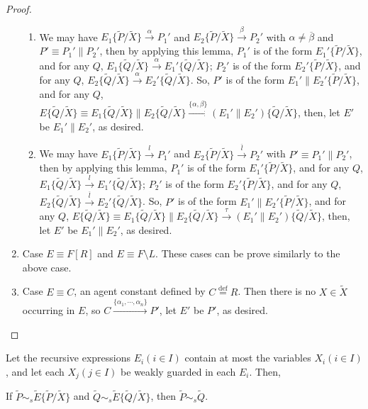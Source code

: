 \begin{proof}
\begin{enumerate}
\begin{enumerate}
    \item We may have $E_1\{\widetilde{P}/\widetilde{X}\} \xrightarrow{\alpha}P_1'$ and $E_2\{\widetilde{P}/\widetilde{X}\}\xrightarrow{\beta}P_2'$ with $\alpha\neq\overline{\beta}$ and $P'\equiv P_1'\parallel P_2'$, then by applying this lemma, $P_1'$ is of the form $E_1'\{\widetilde{P}/\widetilde{X}\}$, and for any $Q$, $E_1\{\widetilde{Q}/\widetilde{X}\}\xrightarrow{\alpha} E_1'\{\widetilde{Q}/\widetilde{X}\}$; $P_2'$ is of the form $E_2'\{\widetilde{P}/\widetilde{X}\}$, and for any $Q$, $E_2\{\widetilde{Q}/\widetilde{X}\}\xrightarrow{\alpha} E_2'\{\widetilde{Q}/\widetilde{X}\}$. So, $P'$ is of the form $E_1'\parallel E_2'\{\widetilde{P}/\widetilde{X}\}$, and for any $Q$, $E\{\widetilde{Q}/\widetilde{X}\}\equiv E_1\{\widetilde{Q}/\widetilde{X}\}\parallel E_2\{\widetilde{Q}/\widetilde{X}\}\xrightarrow{\{\alpha,\beta\}} (E_1'\parallel E_2')\{\widetilde{Q}/\widetilde{X}\}$, then, let $E'$ be $E_1'\parallel E_2'$, as desired.
    \item We may have $E_1\{\widetilde{P}/\widetilde{X}\} \xrightarrow{l}P_1'$ and $E_2\{\widetilde{P}/\widetilde{X}\}\xrightarrow{\overline{l}}P_2'$ with $P'\equiv P_1'\parallel P_2'$, then by applying this lemma, $P_1'$ is of the form $E_1'\{\widetilde{P}/\widetilde{X}\}$, and for any $Q$, $E_1\{\widetilde{Q}/\widetilde{X}\}\xrightarrow{l} E_1'\{\widetilde{Q}/\widetilde{X}\}$; $P_2'$ is of the form $E_2'\{\widetilde{P}/\widetilde{X}\}$, and for any $Q$, $E_2\{\widetilde{Q}/\widetilde{X}\}\xrightarrow{\overline{l}} E_2'\{\widetilde{Q}/\widetilde{X}\}$. So, $P'$ is of the form $E_1'\parallel E_2'\{\widetilde{P}/\widetilde{X}\}$, and for any $Q$, $E\{\widetilde{Q}/\widetilde{X}\}\equiv E_1\{\widetilde{Q}/\widetilde{X}\}\parallel E_2\{\widetilde{Q}/\widetilde{X}\}\xrightarrow{\tau} (E_1'\parallel E_2')\{\widetilde{Q}/\widetilde{X}\}$, then, let $E'$ be $E_1'\parallel E_2'$, as desired.
  \end{enumerate}
  \item Case $E\equiv F[R]$ and $E\equiv F\setminus L$. These cases can be prove similarly to the above case.
  \item Case $E\equiv C$, an agent constant defined by $C\overset{\text{def}}{=}R$. Then there is no $X\in\widetilde{X}$ occurring in $E$, so $C\xrightarrow{\{\alpha_1,\cdots,\alpha_n\}}P'$, let $E'$ be $P'$, as desired.
\end{enumerate}
\end{proof}

\begin{theorem}\label{USSSB}
Let the recursive expressions $E_i(i\in I)$ contain at most the variables $X_i(i\in I)$, and let each $X_j(j\in I)$ be weakly guarded in each $E_i$. Then,

If $\widetilde{P}\sim_s \widetilde{E}\{\widetilde{P}/\widetilde{X}\}$ and $\widetilde{Q}\sim_s \widetilde{E}\{\widetilde{Q}/\widetilde{X}\}$, then $\widetilde{P}\sim_s \widetilde{Q}$.
\end{theorem}

